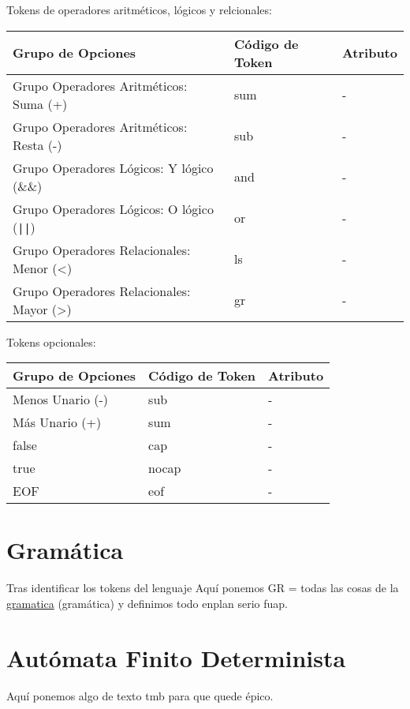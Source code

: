 \documentclass{article}
\begin{document}
Tokens de operadores aritméticos, lógicos y relcionales:
\begin{table}[h!]
    \centering
    \begin{tabular}{|l|l|l|}
        \hline
        \textbf{Grupo de Opciones} & \textbf{Código de Token} & \textbf{Atributo} \\ \hline
        Grupo Operadores Aritméticos: Suma (+) & sum & - \\ \hline
        Grupo Operadores Aritméticos: Resta (-) & sub & - \\ \hline
        Grupo Operadores Lógicos: Y lógico (\&\&) & and & - \\ \hline
        Grupo Operadores Lógicos: O lógico (\texttt{||}) & or & - \\ \hline
        Grupo Operadores Relacionales: Menor (<) & ls & - \\ \hline
        Grupo Operadores Relacionales: Mayor (>) & gr & - \\ \hline
    \end{tabular}
\end{table}

Tokens opcionales:
\begin{table}[h!]
    \centering
    \begin{tabular}{|l|l|l|}
        \hline
        \textbf{Grupo de Opciones} & \textbf{Código de Token} & \textbf{Atributo} \\ \hline
        Menos Unario (-) & sub & - \\ \hline
        Más Unario (+) & sum & - \\ \hline
        false & cap & - \\ \hline
        true & nocap & - \\ \hline
        EOF & eof & - \\ \hline
    \end{tabular}
\end{table}




\section{Gramática}
Tras identificar los tokens del lenguaje 
Aquí ponemos GR = {todas las cosas de la \underline{gramatica} (gramática)} y definimos todo enplan serio fuap.

\section{Autómata Finito Determinista}
Aquí ponemos algo de texto tmb para que quede épico.
\end{document}
